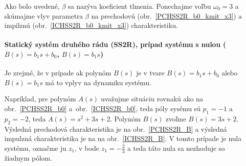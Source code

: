 \documentclass[a4paper, 10pt, ]{article}
\begin{document}
\begin{center}


	\label{ICHSS2R_b0_kmit}

\end{center}

Ako bolo uvedené, $\beta$ sa nazýva koeficient tlmenia. Ponechajme voľbu $\omega_0 = 3$ a skúmajme vlyv parametra $\beta$ na prechodovú (obr.~\ref{PCHSS2R_b0_kmit_x3}) a impilznú (obr.~\ref{ICHSS2R_b0_kmit_x3}) charakteristiku.

\begin{center}


	\label{PCHSS2R_b0_kmit_x3}

\end{center}


\begin{center}


	\label{ICHSS2R_b0_kmit_x3}

\end{center}






\paragraph{Statický systém druhého rádu (SS2R), prípad systému s nulou ($B(s) = b_1 s + b_0$, $B(s) = b_1 s$)}

Je zrejmé, že v prípade ak polynóm $B(s)$ je v tvare $B(s) = b_1 s + b_0$ alebo $B(s) = b_1 s$ má to vplyv na dynamiku systému.

Napríklad, pre polynóm $A(s)$ uvažujme situáciu rovnakú ako na obr.~\ref{PCHSS2R_b0} a~obr.~\ref{ICHSS2R_b0}, teda póly sysému sú $p_1 = -1$ a $p_2 = -2$, teda $A(s) = s^2 + 3s + 2$. Polynóm $B(s)$ zvoľme $B(s) = 3 s + 2$. Výsledná prechodová charakteristika je na obr.~\ref{PCHSS2R_B} a výsledná impulzná charakteristika je na na obr.~\ref{ICHSS2R_B}. V tomto prípade je nula systému, označme ju $z_1$, v bode $z_1 = -\frac{2}{3}$ a teda táto nula sa nezhoduje so žiadnym pólom.
\end{document}
